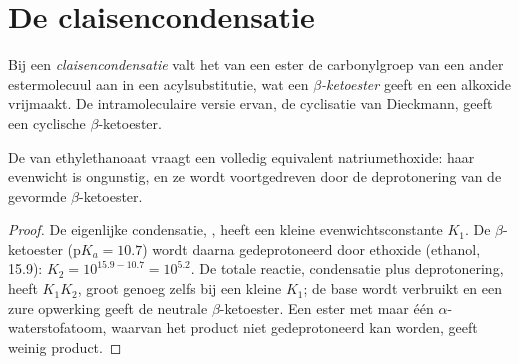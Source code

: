 \section{De claisencondensatie}

\begin{definition}[Claisencondensatie]\label{def:b2:enolates-aldol:claisen}
Bij een \emph{claisencondensatie} valt het  van een ester de
carbonylgroep van een ander estermolecuul aan in een acylsubstitutie, wat een \emph{$\beta$-ketoester}
geeft en een alkoxide vrijmaakt. De intramoleculaire versie ervan, de cyclisatie van
Dieckmann, geeft een cyclische $\beta$-ketoester.
\end{definition}

\begin{proposition}\label{prop:b2:enolates-aldol:claisen-drive}
De  van ethylethanoaat vraagt een volledig equivalent natriumethoxide: haar evenwicht
is ongunstig, en ze wordt voortgedreven door de deprotonering van de gevormde $\beta$-ketoester.
\end{proposition}

\begin{proof}
De eigenlijke condensatie, , heeft een kleine evenwichtsconstante
$K_1$. De $\beta$-ketoester ($\mathrm pK_a = 10.7$) wordt daarna gedeprotoneerd door ethoxide (ethanol, 15.9):
$K_2 = 10^{15.9 - 10.7} = 10^{5.2}$. De totale reactie, condensatie plus deprotonering, heeft
$K_1K_2$, groot genoeg zelfs bij een kleine $K_1$; de base wordt verbruikt en een zure opwerking geeft de neutrale
$\beta$-ketoester. Een ester met maar één $\alpha$-waterstofatoom, waarvan het product niet gedeprotoneerd kan worden, geeft
weinig product.
\end{proof}

